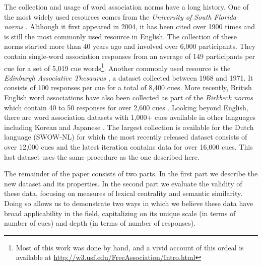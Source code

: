 \documentclass[a4paper,doc,natbib,floatsintext]{apa6}
\begin{document}
The collection and usage of word association norms have a long history. One of the most widely used resources comes from the \textit{University of South Florida norms} \citep[USF norms,][]{Nelson2004}. Although it first appeared in 2004, it has been cited over 1900 times and is still the most commonly used resource in English. The collection of these norms started more than 40 years ago and involved over 6,000 participants. They contain single-word association responses from an average of 149 participants per cue for a set of 5,019 cue words\footnote{Most of this work was done by hand, and a vivid account of this ordeal is available at \url{http://w3.usf.edu/FreeAssociation/Intro.html}}. Another commonly used resource is the \textit{Edinburgh Associative Thesaurus} \cite[EAT;][]{Kiss1973},  a dataset collected between 1968 and 1971. It consists of 100 responses per cue for a total of 8,400 cues. More recently, British English word associations have also been collected as part of the \textit{Birkbeck norms} which contain 40 to 50 responses for over 2,600 cues \citep{Moss1996}. Looking beyond English, there are word association datasets with 1,000+ cues available in other languages including Korean \cite[3,900 cues;][]{Jung2010} and Japanese \cite[2,100 cues;][]{Joyce2005}.
The largest collection is available for the Dutch language (SWOW-NL) for which the most recently released dataset consists of over 12,000 cues \citep{DeDeyne2013b} and the latest iteration contains data for over 16,000 cues. This last dataset uses the same procedure as the one described here.

The remainder of the paper consists of two parts. In the first part we describe the new dataset and its properties. In the second part we evaluate the validity of these data, focusing on measures of lexical centrality and semantic similarity. Doing so allows us to demonstrate two ways in which we believe these data have broad applicability in the field, capitalizing on its unique scale (in terms of number of cues) and depth (in terms of number of responses).
\end{document}
